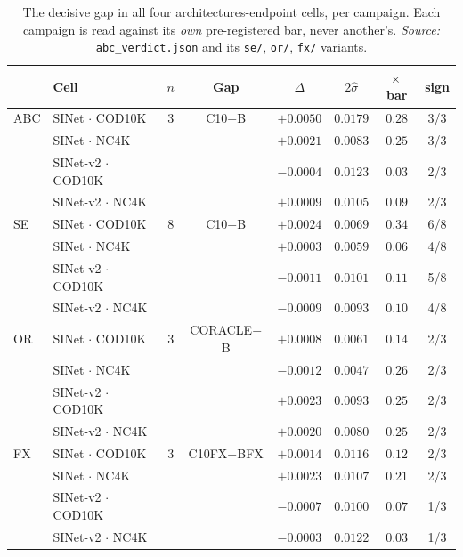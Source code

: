 \documentclass{article}
\begin{document}
\begin{table}[h]
\caption{The decisive gap in all four architectures-endpoint cells, per campaign. Each campaign is
read against its \emph{own} pre-registered bar, never another's. \emph{Source:}
\texttt{abc\_verdict.json} and its \texttt{se/}, \texttt{or/}, \texttt{fx/} variants.}
\label{tab:allcells}
\begin{center}
\small
\begin{tabular}{@{}llcccccc@{}}
\toprule
& Cell & $n$ & Gap & $\Delta$ & $2\hat{\sigma}$ & $\times$\,bar & sign \\
\midrule
ABC & SINet $\cdot$ COD10K & 3 & C10$-$B & $+0.0050$ & $0.0179$ & $0.28$ & 3/3 \\
 & SINet $\cdot$ NC4K &  &  & $+0.0021$ & $0.0083$ & $0.25$ & 3/3 \\
 & SINet-v2 $\cdot$ COD10K &  &  & $-0.0004$ & $0.0123$ & $0.03$ & 2/3 \\
 & SINet-v2 $\cdot$ NC4K &  &  & $+0.0009$ & $0.0105$ & $0.09$ & 2/3 \\
\midrule
SE & SINet $\cdot$ COD10K & 8 & C10$-$B & $+0.0024$ & $0.0069$ & $0.34$ & 6/8 \\
 & SINet $\cdot$ NC4K &  &  & $+0.0003$ & $0.0059$ & $0.06$ & 4/8 \\
 & SINet-v2 $\cdot$ COD10K &  &  & $-0.0011$ & $0.0101$ & $0.11$ & 5/8 \\
 & SINet-v2 $\cdot$ NC4K &  &  & $-0.0009$ & $0.0093$ & $0.10$ & 4/8 \\
\midrule
OR & SINet $\cdot$ COD10K & 3 & CORACLE$-$B & $+0.0008$ & $0.0061$ & $0.14$ & 2/3 \\
 & SINet $\cdot$ NC4K &  &  & $-0.0012$ & $0.0047$ & $0.26$ & 2/3 \\
 & SINet-v2 $\cdot$ COD10K &  &  & $+0.0023$ & $0.0093$ & $0.25$ & 2/3 \\
 & SINet-v2 $\cdot$ NC4K &  &  & $+0.0020$ & $0.0080$ & $0.25$ & 2/3 \\
\midrule
FX & SINet $\cdot$ COD10K & 3 & C10FX$-$BFX & $+0.0014$ & $0.0116$ & $0.12$ & 2/3 \\
 & SINet $\cdot$ NC4K &  &  & $+0.0023$ & $0.0107$ & $0.21$ & 2/3 \\
 & SINet-v2 $\cdot$ COD10K &  &  & $-0.0007$ & $0.0100$ & $0.07$ & 1/3 \\
 & SINet-v2 $\cdot$ NC4K &  &  & $-0.0003$ & $0.0122$ & $0.03$ & 1/3 \\
\bottomrule
\end{tabular}
\end{center}
\end{table}
\end{document}
